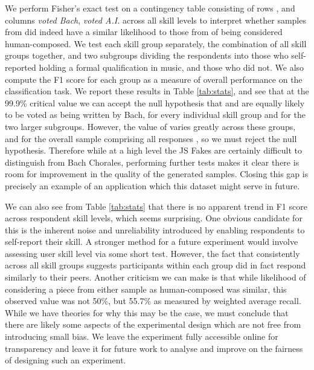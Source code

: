 \documentclass{article}
\begin{document}
We perform Fisher's exact test on a contingency table consisting of rows ,  and columns \textit{voted Bach}, \textit{voted A.I.} across all skill levels to interpret whether samples from  did indeed have a similar likelihood to those from  of being considered human-composed. We test each skill group separately, the combination of all skill groups together, and two subgroups dividing the respondents into those who self-reported holding a formal qualification in music, and those who did not. We also compute the F1 score for each group as a measure of overall performance on the classification task. We report these results in Table \ref{tab:stats}, and see that at the 99.9\% critical value we can accept the null hypothesis that  and  are equally likely to be voted as being written by Bach, for every individual skill group and for the two larger subgroups. However, the value of  varies greatly across these groups, and for the overall sample comprising all responses , so we must reject the null hypothesis. Therefore while at a high level the JS Fakes are certainly difficult to distinguish from Bach Chorales, performing further tests makes it clear there is room for improvement in the quality of the generated samples. Closing this gap is precisely an example of an application which this dataset might serve in future.

We can also see from Table \ref{tab:stats} that there is no apparent trend in F1 score across respondent skill levels, which seems surprising. One obvious candidate for this is the inherent noise and unreliability introduced by enabling respondents to self-report their skill. A stronger method for a future experiment would involve assessing user skill level via some short test. However, the fact that  consistently across all skill groups suggests participants within each group did in fact respond similarly to their peers. Another criticism we can make is that while likelihood of considering a piece from either sample as human-composed was similar, this observed value was not 50\%, but 55.7\% as measured by weighted average recall. While we have theories for why this may be the case, we must conclude that there are likely some aspects of the experimental design which are not free from introducing small bias. We leave the experiment fully accessible online for transparency and leave it for future work to analyse and improve on the fairness of designing such an experiment.
\end{document}
